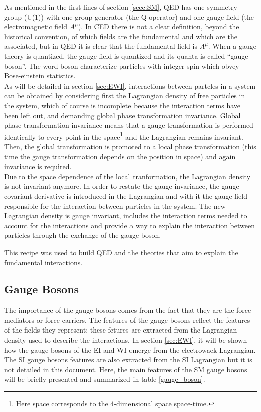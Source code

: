 \noindent As mentioned in the first lines of section \ref{secc:SM}, QED has one symmetry group (U(1)) with one group generator (the Q operator) and one gauge field (the electromagnetic field $A^\mu$). In CED there is not a clear definition, beyond the historical convention, of which fields are the fundamental and which are the associated, but in QED it is clear that the fundamental field is $A^\mu$. When a gauge theory is quantized, the gauge field is quantized and its quanta is called ``gauge boson''. The word boson characterize particles with integer spin which obvey Bose-einstein statistics.\\      

\noindent As will be detailed in section \ref{sec:EWI}, interactions between partcles in a system can be obtained by considering first the Lagrangian density of free particles in the system, which of course is incomplete because the interaction terms have been left out, and demanding global phase transformation invariance. Global phase transformation invariance means that a gauge transformation is performed identically to every point in the space\footnote{Here space corresponds to the 4-dimensional space \ie space-time.} and the Lagrangian remains invariant. Then, the global transformation is promoted to a local phase transformation (this time the gauge transformation depends on the position in space) and again invariance is required.\\

\noindent Due to the space dependence of the local tranformation, the Lagrangian density is not invariant anymore. In order to restate the gauge invariance, the gauge covariant derivative is introduced in the Lagrangian and with it the gauge field responsible for the interaction between particles in the system. The new Lagrangian density is gauge invariant, includes the interaction terms needed to account for the interactions and provide a way to explain the interaction between particles through the exchange of the gauge boson.

\noindent This recipe was used to build QED and the theories that aim to explain the fundamental interactions.   

\subsection{Gauge Bosons}\label{sec:gb}

The importance of the gauge bosons comes from the fact that they are the force mediators or force carriers. The features of the gauge bosons reflect the features of the fields they represent; these fetures are extracted from the Lagrangian density used to describe the interactions. In section \ref{sec:EWI}, it will be shown how the gauge bosons of the EI and WI emerge from the electrowaek Lagrangian. The SI gauge bosons features are also extracted from the SI Lagrangian but it is not detailed in this document. Here, the main features of the SM gauge bosons will be briefly presented and summarized in table \ref{gauge_boson}.

